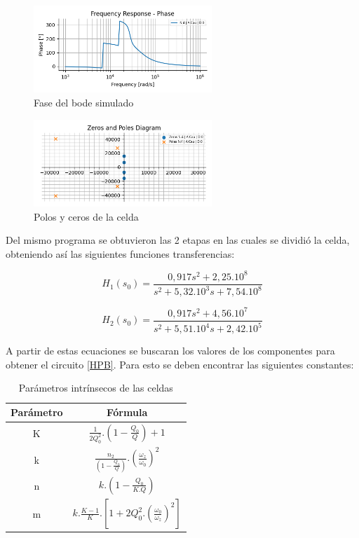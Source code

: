 \begin{figure}[h]
	\includegraphics[width=0.6\textwidth]{../Ejercicio2-DisenoDeCeldas/3CeldaSedra/Imagenes/Fase Sedra.png}
	\centering
	\caption{Fase del bode simulado}
	\label{FaseSimulado}
\end{figure}

\begin{figure}[h]
	\includegraphics[width=0.6\textwidth]{../Ejercicio2-DisenoDeCeldas/3CeldaSedra/Imagenes/PolosSedra.png}
	\centering
	\caption{Polos y ceros de la celda}
	\label{PolosSedra}
\end{figure}

Del mismo programa se obtuvieron las 2 etapas en las cuales se dividió la celda, obteniendo así las siguientes funciones transferencias:


\begin{equation}
H_1(s_0) = \frac{0,917 s^2  + 2,25.10^8}{s^2 + 5,32.10^3 s + 7,54.10^8}
\label{EcH1sedra}
\end{equation}

\begin{equation}
H_2(s_0) = \frac{0,917 s^2  + 4,56.10^7}{s^2 + 5,51.10^4 s + 2,42.10^5}
\label{EcH2sedra}
\end{equation}

A partir de estas ecuaciones se buscaran los valores de los componentes para obtener el circuito \ref{HPB}. Para esto se deben encontrar las siguientes constantes:

\begin{table}[h]
\begin{tabular}{|c|c|}
\hline
\textbf{Parámetro} & \textbf{Fórmula} 													   \\ \hline
K                  & $\frac{1}{2Q_0^2} . (1 - \frac{Q_0}{Q}) + 1 $     					        \\ \hline
k                  & $ \frac{n_2}{(1 - \frac{Q_0}{Q})} . (\frac{\omega_z}{\omega_0})^2$   \\ \hline
n                  & $k.(1- \frac{Q_0}{K.Q})$             									\\ \hline
m                  & $k.\frac{K-1}{K}. [1 + 2Q_0^2. (\frac{\omega_0}{\omega_z})^2]$              \\ \hline
\end{tabular}
\centering
\caption{Parámetros intrínsecos de las celdas}
\label{paramSedra}
\end{table}


